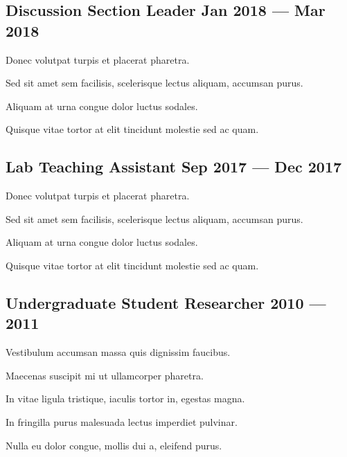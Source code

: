 \documentclass[letter,10pt]{article}
\begin{document}
\subsection{{Discussion Section Leader \hfill Jan 2018 --- Mar 2018}}
\begin{zitemize}
\item Donec volutpat turpis et placerat pharetra.
\item Sed sit amet sem facilisis, scelerisque lectus aliquam, accumsan purus.
\item Aliquam at urna congue dolor luctus sodales.
\item Quisque vitae tortor at elit tincidunt molestie sed ac quam.
\end{zitemize}

\subsection{{Lab Teaching Assistant \hfill Sep 2017 --- Dec 2017}}
\begin{zitemize}
\item Donec volutpat turpis et placerat pharetra.
\item Sed sit amet sem facilisis, scelerisque lectus aliquam, accumsan purus.
\item Aliquam at urna congue dolor luctus sodales.
\item Quisque vitae tortor at elit tincidunt molestie sed ac quam.
\end{zitemize}

\subsection{{Undergraduate Student Researcher \hfill 2010 --- 2011}}
\begin{zitemize}
\item Vestibulum accumsan massa quis dignissim faucibus.
\item Maecenas suscipit mi ut ullamcorper pharetra.
\item In vitae ligula tristique, iaculis tortor in, egestas magna.
\item In fringilla purus malesuada lectus imperdiet pulvinar.
\item Nulla eu dolor congue, mollis dui a, eleifend purus.
\end{zitemize}
\end{document}
